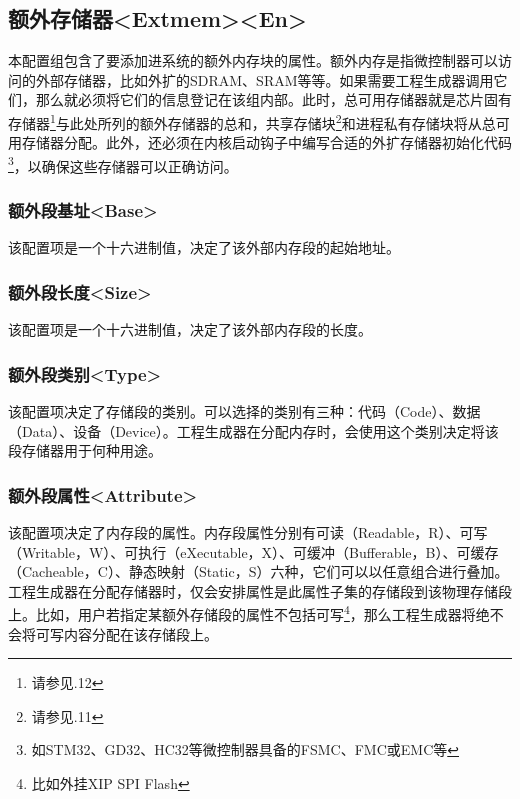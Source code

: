 \subsection{额外存储器<Extmem><En>{}}\label{subsec:5-3-10}

本配置组包含了要添加进系统的额外内存块的属性。额外内存是指微控制器可以访问的外部存储器，比如外扩的SDRAM、SRAM等等。如果需要工程生成器调用它们，那么就必须将它们的信息登记在该组内部。此时，总可用存储器就是芯片固有存储器\footnote{请参见.12}与此处所列的额外存储器的总和，共享存储块\footnote{请参见.11}和进程私有存储块将从总可用存储器分配。此外，还必须在内核启动钩子中编写合适的外扩存储器初始化代码\footnote{如STM32、GD32、HC32等微控制器具备的FSMC、FMC或EMC等}，以确保这些存储器可以正确访问。

\subsubsection{额外段基址<Base>{}}\label{subsubsec:5-3-10-1}

该配置项是一个十六进制值，决定了该外部内存段的起始地址。

\subsubsection{额外段长度<Size>{}}\label{subsubsec:5-3-10-2}

该配置项是一个十六进制值，决定了该外部内存段的长度。

\subsubsection{额外段类别<Type>{}}\label{subsubsec:5-3-10-3}

该配置项决定了存储段的类别。可以选择的类别有三种：代码（Code）、数据（Data）、设备（Device）。工程生成器在分配内存时，会使用这个类别决定将该段存储器用于何种用途。

\subsubsection{额外段属性<Attribute>{}}\label{subsubsec:5-3-10-4}

该配置项决定了内存段的属性。内存段属性分别有可读（Readable，R）、可写（Writable，W）、可执行（eXecutable，X）、可缓冲（Bufferable，B）、可缓存（Cacheable，C）、静态映射（Static，S）六种，它们可以以任意组合进行叠加。工程生成器在分配存储器时，仅会安排属性是此属性子集的存储段到该物理存储段上。比如，用户若指定某额外存储段的属性不包括可写\footnote{比如外挂XIP SPI Flash}，那么工程生成器将绝不会将可写内容分配在该存储段上。

